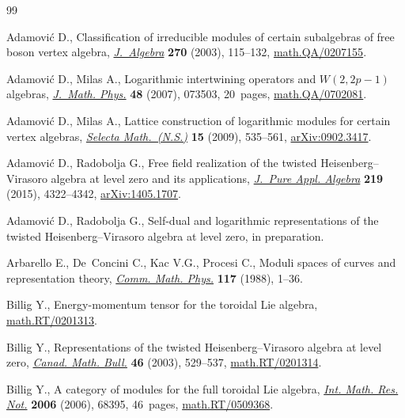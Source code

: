 \documentclass[pdftex]{sigma}
\numberwithin{equation}{section}
\begin{document}
\begin{thebibliography}{99}
\footnotesize\itemsep=0pt

Adamovi{\'c} D., Classif\/ication of irreducible modules of certain subalgebras
 of free boson vertex algebra, \href{http://dx.doi.org/10.1016/j.jalgebra.2003.07.011}{\textit{J.~Algebra}} \textbf{270} (2003),
 115--132, \href{http://arxiv.org/abs/math.QA/0207155}{math.QA/0207155}.

Adamovi{\'c} D., Milas A., Logarithmic intertwining operators and {$W(2,2p-1)$}
 algebras, \href{http://dx.doi.org/10.1063/1.2747725}{\textit{J.~Math. Phys.}} \textbf{48} (2007), 073503, 20~pages,
 \href{http://arxiv.org/abs/math.QA/0702081}{math.QA/0702081}.

Adamovi{\'c} D., Milas A., Lattice construction of logarithmic modules for
 certain vertex algebras, \href{http://dx.doi.org/10.1007/s00029-009-0009-z}{\textit{Selecta Math.~(N.S.)}} \textbf{15} (2009),
 535--561, \href{http://arxiv.org/abs/0902.3417}{arXiv:0902.3417}.

Adamovi{\'c} D., Radobolja G., Free f\/ield realization of the twisted
 {H}eisenberg--{V}irasoro algebra at level zero and its applications,
 \href{http://dx.doi.org/10.1016/j.jpaa.2015.02.019}{\textit{J.~Pure Appl. Algebra}} \textbf{219} (2015), 4322--4342,
 \href{http://arxiv.org/abs/1405.1707}{arXiv:1405.1707}.

Adamovi{\'c} D., Radobolja G., Self-dual and logarithmic representations of the twisted {H}eisenberg--{V}irasoro algebra at level zero, {i}n preparation.

Arbarello E., De~Concini C., Kac V.G., Procesi C., Moduli spaces of curves and
 representation theory, \href{http://dx.doi.org/10.1007/BF01228409}{\textit{Comm. Math. Phys.}} \textbf{117} (1988), 1--36.

Billig Y., Energy-momentum tensor for the toroidal {L}ie algebra,
 \href{http://arxiv.org/abs/math.RT/0201313}{math.RT/0201313}.

Billig Y., Representations of the twisted {H}eisenberg--{V}irasoro algebra at
 level zero, \href{http://dx.doi.org/10.4153/CMB-2003-050-8}{\textit{Canad. Math. Bull.}} \textbf{46} (2003), 529--537,
 \href{http://arxiv.org/abs/math.RT/0201314}{math.RT/0201314}.

Billig Y., A category of modules for the full toroidal {L}ie algebra,
 \href{http://dx.doi.org/10.1155/IMRN/2006/68395}{\textit{Int. Math. Res. Not.}} \textbf{2006} (2006), 68395, 46~pages,
 \href{http://arxiv.org/abs/math.RT/0509368}{math.RT/0509368}.


\end{thebibliography}
\end{document}
